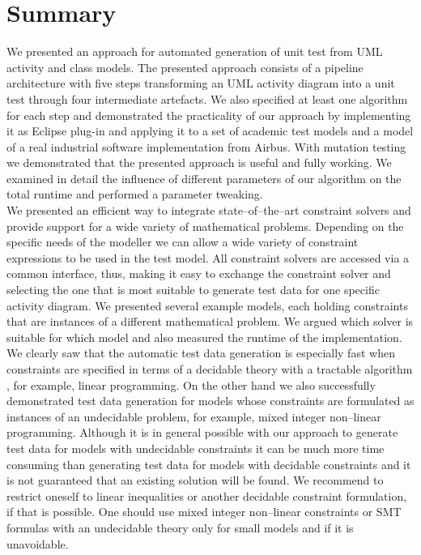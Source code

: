 \section{Summary}
We presented an approach for automated generation of unit test from UML activity and class models. The presented approach consists of a pipeline architecture with five steps transforming an UML activity diagram into a unit test through four intermediate artefacts. We also specified at least one algorithm for each step and demonstrated the practicality of our approach by implementing it as Eclipse plug-in and applying it to a set of academic test models and a model of a real industrial software implementation from Airbus. With mutation testing we demonstrated that the presented approach is useful and fully working. We examined in detail the influence of different parameters of our algorithm on the total runtime and performed a parameter tweaking.\\
We presented an efficient way to integrate state--of--the--art constraint solvers and provide support for a wide variety of mathematical problems. Depending on the specific needs of the modeller we can allow a wide variety of constraint expressions to be used in the test model. All constraint solvers are accessed via a common interface, thus, making it easy to exchange the constraint solver and selecting the one that is most suitable to generate test data for one specific activity diagram. We presented several example models, each holding constraints that are instances of a different mathematical problem. We argued which solver is suitable for which model and also measured the runtime of the implementation. We clearly saw that the automatic test data generation is especially fast when constraints are specified in terms of a decidable theory with a tractable algorithm , for example, linear programming. On the other hand we also successfully demonstrated test data generation for models whose constraints are formulated as instances of an undecidable problem, for example, mixed integer non--linear programming. Although it is in general possible with our approach to generate test data for models with undecidable constraints it can be much more time consuming than generating test data for models with decidable constraints and it is not guaranteed that an existing solution will be found. We recommend to restrict oneself to linear inequalities or another decidable constraint formulation, if that is possible. One should use mixed integer non--linear constraints or SMT formulas with an undecidable theory only for small models and if it is unavoidable.\\
